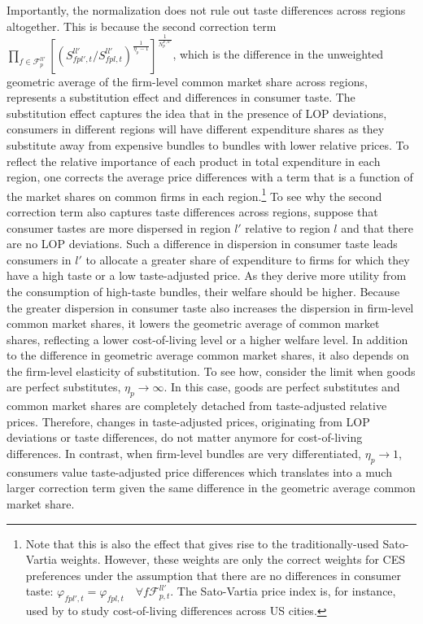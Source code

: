 \noindent Importantly, the normalization does not rule out taste differences across regions altogether. This is because the second correction term $\prod_{f \in \mathcal{F}^{ll'}_{p}} \left[\left(S^{ll'}_{fpl',t}\bigg / S^{ll'}_{fpl,t}\right)^{\frac{1}{\eta_p-1}}\right]^{\frac{1}{N^{F,ll'}_p}}$, which is the difference in the unweighted geometric average of the firm-level common market share across regions, represents a substitution effect and differences in consumer taste. The substitution effect captures the idea that in the presence of LOP deviations, consumers in different regions will have different expenditure shares as they substitute away from expensive bundles to bundles with lower relative prices. To reflect the relative importance of each product in total expenditure in each region, one corrects the average price differences with a term that is a function of the market shares on common firms in each region.\footnote{Note that this is also the effect that gives rise to the traditionally-used Sato-Vartia weights. However, these weights are only the correct weights for CES preferences under the assumption that there are no differences in consumer taste: $\varphi_{fpl',t} = \varphi_{fpl,t} \quad \forall f \mathcal{F}^{ll'}_{p,t}$. The Sato-Vartia price index is, for instance, used by \citet{Handbury2015} to study cost-of-living differences across US cities.} To see why the second correction term also captures taste differences across regions, suppose that consumer tastes are more dispersed in region $l'$ relative to region $l$ and that there are no LOP deviations. Such a difference in dispersion in consumer taste leads consumers in $l'$ to allocate a greater share of expenditure to firms for which they have a high taste or a low taste-adjusted price. As they derive more utility from the consumption of high-taste bundles, their welfare should be higher. Because the greater dispersion in consumer taste also increases the dispersion in firm-level common market shares, it lowers the geometric average of common market shares, reflecting a lower cost-of-living level or a higher welfare level. In addition to the difference in geometric average common market shares, it also depends on the firm-level elasticity of substitution. To see how, consider the limit when goods are perfect substitutes, $\eta_p \rightarrow\infty$. In this case, goods are perfect substitutes and common market shares are completely detached from taste-adjusted relative prices. Therefore, changes in taste-adjusted prices, originating from LOP deviations or taste differences, do not matter anymore for cost-of-living differences. In contrast, when firm-level bundles are very differentiated,  $\eta_p \rightarrow 1$, consumers value taste-adjusted price differences which translates into a much larger correction term given the same difference in the geometric average common market share.

